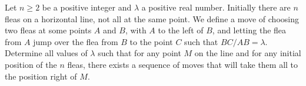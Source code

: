 Let $n \geq 2$ be a positive integer and $\lambda$ a positive real number. Initially there are $n$ fleas on a horizontal line, not all at the same point. We define a move of choosing two fleas at some points $A$ and $B$, with $A$ to the left of $B$, and letting the flea from $A$ jump over the flea from $B$ to the point $C$ such that $BC/AB = \lambda$. Determine all values of $\lambda$ such that for any point $M$ on the line and for any initial position of the $n$ fleas, there exists a sequence of moves that will take them all to the position right of $M$.
